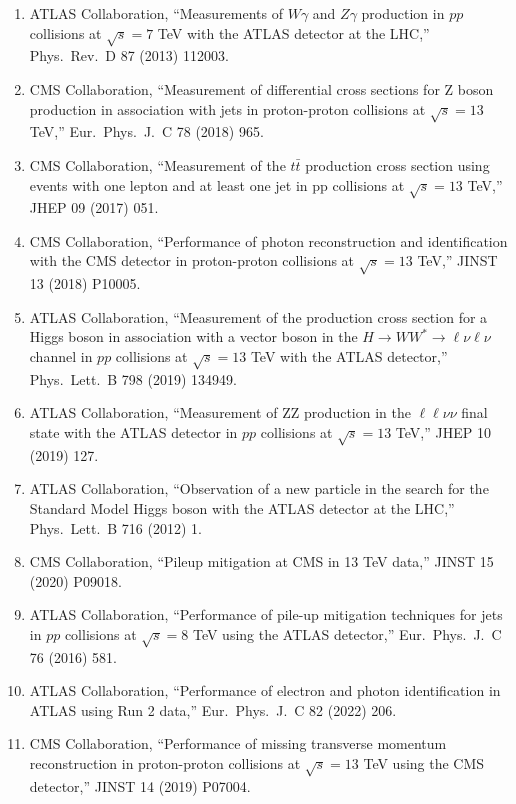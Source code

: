 \documentclass{article}
\begin{document}
\begin{enumerate}
    \item ATLAS Collaboration, ``Measurements of $W\gamma$ and $Z\gamma$ production in $pp$ collisions at $\sqrt{s}=7$ TeV with the ATLAS detector at the LHC,'' Phys.\ Rev.\ D 87 (2013) 112003.
    
    \item CMS Collaboration, ``Measurement of differential cross sections for Z boson production in association with jets in proton-proton collisions at $\sqrt{s} = 13$ TeV,'' Eur.\ Phys.\ J.\ C 78 (2018) 965.
    
    \item CMS Collaboration, ``Measurement of the $t\bar{t}$ production cross section using events with one lepton and at least one jet in pp collisions at $\sqrt{s} = 13$ TeV,'' JHEP 09 (2017) 051.
    
    \item CMS Collaboration, ``Performance of photon reconstruction and identification with the CMS detector in proton-proton collisions at $\sqrt{s} = 13$ TeV,'' JINST 13 (2018) P10005.
    
    \item ATLAS Collaboration, ``Measurement of the production cross section for a Higgs boson in association with a vector boson in the $H \rightarrow WW^* \rightarrow \ell\nu\ell\nu$ channel in $pp$ collisions at $\sqrt{s} = 13$ TeV with the ATLAS detector,'' Phys.\ Lett.\ B 798 (2019) 134949.
    
    \item ATLAS Collaboration, ``Measurement of ZZ production in the $\ell\ell\nu\nu$ final state with the ATLAS detector in $pp$ collisions at $\sqrt{s} = 13$ TeV,'' JHEP 10 (2019) 127.
    
    \item ATLAS Collaboration, ``Observation of a new particle in the search for the Standard Model Higgs boson with the ATLAS detector at the LHC,'' Phys.\ Lett.\ B 716 (2012) 1.
    
    \item CMS Collaboration, ``Pileup mitigation at CMS in 13 TeV data,'' JINST 15 (2020) P09018.
    
    \item ATLAS Collaboration, ``Performance of pile-up mitigation techniques for jets in $pp$ collisions at $\sqrt{s} = 8$ TeV using the ATLAS detector,'' Eur.\ Phys.\ J.\ C 76 (2016) 581.
    
    \item ATLAS Collaboration, ``Performance of electron and photon identification in ATLAS using Run 2 data,'' Eur.\ Phys.\ J.\ C 82 (2022) 206.
    
    \item CMS Collaboration, ``Performance of missing transverse momentum reconstruction in proton-proton collisions at $\sqrt{s} = 13$ TeV using the CMS detector,'' JINST 14 (2019) P07004.
\end{enumerate}
\end{document}
